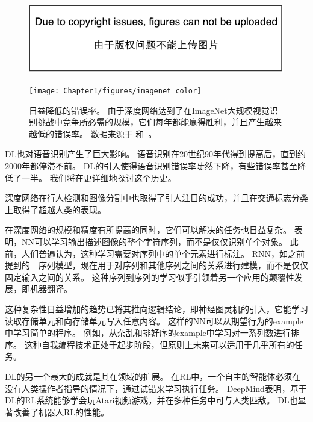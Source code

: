 \begin{figure}[!htb]
\ifOpenSource
\centerline{\includegraphics{figure.pdf}}
\else
\centerline{\texttt{[image: Chapter1/figures/imagenet\_color]}}
\fi
\caption{日益降低的错误率。
由于深度网络达到了在ImageNet大规模视觉识别挑战中竞争所必需的规模，它们每年都能赢得胜利，并且产生越来越低的错误率。
数据来源于 \citet{russakovsky2014imagenet}和~\citet{He-et-al-arxiv2015}。}
\label{fig:chap1_imagenet_color}
\end{figure}


\gls{DL}也对语音识别产生了巨大影响。
语音识别在20世纪90年代得到提高后，直到约2000年都停滞不前。
\gls{DL}的引入\citep{dahl2010phonerec,Deng-2010,Seide2011,Hinton-et-al-2012}使得语音识别错误率陡然下降，有些错误率甚至降低了一半。
我们将在更详细地探讨这个历史。

深度网络在行人检测和图像分割中也取得了引人注目的成功\citep{sermanet-cvpr-13,Farabet-et-al-2013,couprie-iclr-13}，并且在交通标志分类上取得了超越人类的表现\citep{Ciresan-et-al-2012}。

在深度网络的规模和精度有所提高的同时，它们可以解决的任务也日益复杂。
\citet{Goodfellow+et+al-ICLR2014a}表明，\gls{NN}可以学习输出描述图像的整个字符序列，而不是仅仅识别单个对象。
此前，人们普遍认为，这种学习需要对序列中的单个元素进行标注\citep{Gulcehre+Bengio-arxiv-2013}。
\gls{RNN}，如之前提到的~~序列模型，现在用于对序列和其他序列之间的关系进行建模，而不是仅仅固定输入之间的关系。
这种序列到序列的学习似乎引领着另一个应用的颠覆性发展，即机器翻译\citep{Sutskever-et-al-NIPS2014,Bahdanau-et-al-ICLR2015-small}。


这种复杂性日益增加的趋势已将其推向逻辑结论，即神经图灵机\citep{Graves-et-al-arxiv2014}的引入，它能学习读取存储单元和向存储单元写入任意内容。
这样的\gls{NN}可以从期望行为的\gls{example}中学习简单的程序。
例如，从杂乱和排好序的\gls{example}中学习对一系列数进行排序。
这种自我编程技术正处于起步阶段，但原则上未来可以适用于几乎所有的任务。


\gls{DL}的另一个最大的成就是其在领域的扩展。
在\gls{RL}中，一个自主的智能体必须在没有人类操作者指导的情况下，通过试错来学习执行任务。
DeepMind表明，基于\gls{DL}的\gls{RL}系统能够学会玩Atari视频游戏，并在多种任务中可与人类匹敌\citep{Mnih-et-al-2015}。
\gls{DL}也显著改善了机器人\gls{RL}的性能\citep{finn2015learning}。

